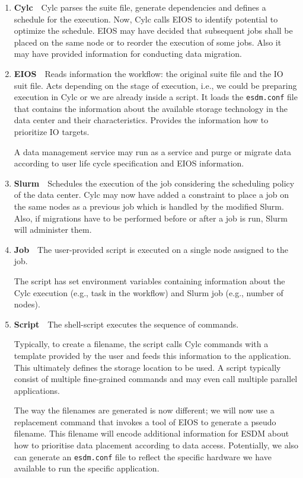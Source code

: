 \documentclass[a4paper]{article}
\begin{document}
\begin{enumerate}
  \item \textbf{Cylc}\ \ Cylc parses the suite file, generate dependencies and defines a schedule for the execution.
  Now, Cylc calls EIOS to identify potential to optimize the schedule.
  EIOS may have decided that subsequent jobs shall be placed on the same node or to reorder the execution of some jobs.
  Also it may have provided information for conducting data migration.

  \item \textbf{EIOS}\ \
  Reads information the workflow: the original suite file and the IO suit file.
  Acts depending on the stage of execution, i.e., we could be preparing execution in Cylc or we are already inside a script.
  It loads the \texttt{esdm.conf} file that contains the information about the available storage technology in the data center and their characteristics.
  Provides the information how to prioritize IO targets.

  A data management service may run as a service and purge or migrate data according to user life cycle specification and EIOS information.

  \item \textbf{Slurm}\ \ Schedules the execution of the job considering the scheduling policy of the data center.
  Cylc may now have added a constraint to place a job on the same nodes as a previous job which is handled by the modified Slurm.
  Also, if migrations have to be performed before or after a job is run, Slurm will administer them.

  \item \textbf{Job}\ \ The user-provided script is executed on a single node assigned to the job.

  The script has set environment variables containing information about the Cylc execution (e.g., task in the workflow) and Slurm job (e.g., number of nodes).

  \item \textbf{Script}\ \ The shell-script executes the sequence of commands.

  Typically, to create a filename, the script calls Cylc commands with a template provided by the user and feeds this information to the application.
  This ultimately defines the storage location to be used.
  A script typically consist of multiple fine-grained commands and may even call multiple parallel applications.

  The way the filenames are generated is now different; we will now use a replacement command that invokes a tool of EIOS to generate a pseudo filename.
  This filename will encode additional information for ESDM about how to prioritise data placement according to data access.
  Potentially, we also can generate an \texttt{esdm.conf} file to reflect the specific hardware we have available to run the specific application.


\end{enumerate}
\end{document}
